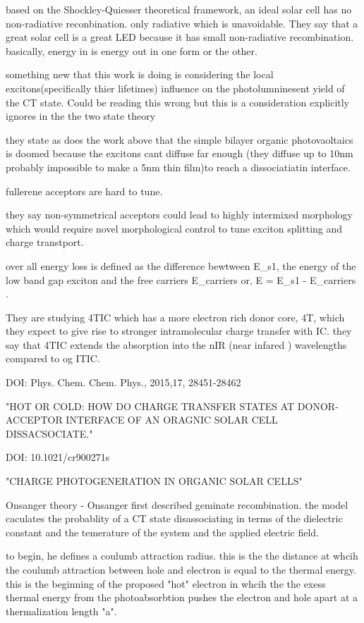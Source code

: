     based on the Shockley-Quiesser theoretical framework, an ideal solar cell has no non-radiative reconbination. only radiative which is
    unavoidable. They say that a great solar cell is a great LED because it has small non-radiative recombination. 
    basically, energy in is energy out in one form or the other.

    something new that this work is doing is considering the local excitons(specifically thier lifetimes) 
    influence on the photolumninesent yield of the CT state. Could be reading this wrong but this is a consideration explicitly
    ignores in the the two state theory

    they state as does the work above that the simple bilayer organic photovaoltaics is doomed because the excitons cant diffuse far enough
    (they diffuse up to 10nm probably impossible to make a 5nm thin film)to reach a dissociatiatin interface. 

    fullerene acceptors are hard to tune. 

    they say non-symmetrical acceptors could lead to highly intermixed morphology which would require novel morphological control to tune 
    exciton splitting and charge transtport. 

    over all energy loss is defined as the difference bewtween E_{s1}, the energy of the low band gap exciton and the free carriers E_{carriers}
    or, \Delta E = E_{s1} - E_{carriers} .


    They are studying 4TIC which has a more electron rich donor core, 4T, which they expect to give rise to
    stronger intramolecular charge transfer with IC. they say that 4TIC extends the absorption into the 
    nIR (near infared ) wavelengths compared to og ITIC.


DOI: 	Phys. Chem. Chem. Phys., 2015,17, 28451-28462
        
"HOT OR COLD: HOW DO CHARGE TRANSFER STATES AT DONOR-ACCEPTOR INTERFACE OF AN ORAGNIC SOLAR CELL DISSACSOCIATE."
        
DOI: 10.1021/cr900271s

"CHARGE PHOTOGENERATION IN ORGANIC SOLAR CELLS"
    
    Onsanger theory - Onsanger first described geminate recombination. the model caculates the probablity
    of a CT state  disassociating in terms of the dielectric constant and the temerature of the system and the 
    applied electric field.

    to begin, he defines a coulumb attraction radius. this is the the distance at whcih the coulumb attraction
    between hole and electron is equal to the thermal energy. this is the beginning of the proposed "hot" electron
    in whcih the the exess thermal energy from the photoabsorbtion pushes the electron and hole apart at a 
    thermalization length "a". 

